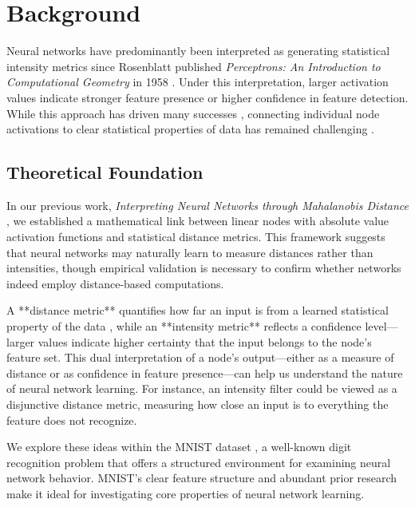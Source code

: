 \section{Background}

Neural networks have predominantly been interpreted as generating statistical intensity metrics since Rosenblatt published \textit{Perceptrons: An Introduction to Computational Geometry} in 1958 \cite{rosenblatt1958perceptron}. Under this interpretation, larger activation values indicate stronger feature presence or higher confidence in feature detection. While this approach has driven many successes \cite{krizhevsky2012imagenet, lecun2015deep}, connecting individual node activations to clear statistical properties of data has remained challenging \cite{olah2017feature, zeiler2014visualizing}.

\subsection{Theoretical Foundation}

In our previous work, \textit{Interpreting Neural Networks through Mahalanobis Distance} \cite{oursland2024interpreting}, we established a mathematical link between linear nodes with absolute value activation functions and statistical distance metrics. This framework suggests that neural networks may naturally learn to measure distances rather than intensities, though empirical validation is necessary to confirm whether networks indeed employ distance-based computations.

A **distance metric** quantifies how far an input is from a learned statistical property of the data \cite{deza2009encyclopedia}, while an **intensity metric** reflects a confidence level—larger values indicate higher certainty that the input belongs to the node's feature set. This dual interpretation of a node's output—either as a measure of distance or as confidence in feature presence—can help us understand the nature of neural network learning. For instance, an intensity filter could be viewed as a disjunctive distance metric, measuring how close an input is to everything the feature does not recognize.

We explore these ideas within the MNIST dataset \cite{lecun1998gradient}, a well-known digit recognition problem that offers a structured environment for examining neural network behavior. MNIST's clear feature structure and abundant prior research make it ideal for investigating core properties of neural network learning.


